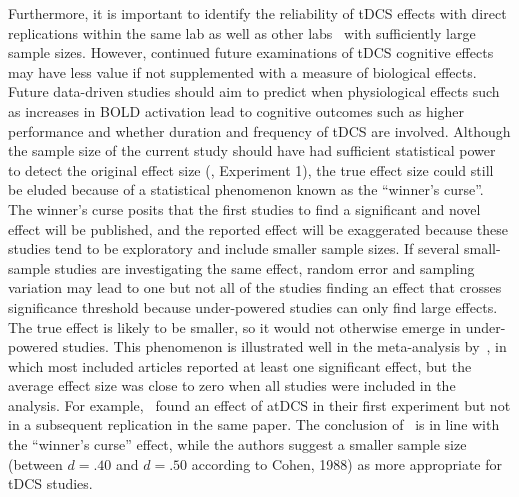 \documentclass[10pt,letterpaper]{article}
\begin{document}
Furthermore, it is important to identify the reliability of tDCS effects with direct replications within the same lab as well as other labs~\cite{cesario2014priming} with sufficiently large sample sizes. However, continued future examinations of tDCS cognitive effects may have less value if not supplemented with a measure of biological effects. Future data-driven studies should aim to predict when physiological effects such as increases in BOLD activation lead to cognitive outcomes such as higher performance and whether duration and frequency of tDCS are involved.   
Although the sample size of the current study should have had sufficient statistical power to detect the original effect size (\cite{medvedeva2019effects}, Experiment 1), the true effect size could still be eluded because of a statistical phenomenon known as the “winner’s curse”. The winner’s curse posits that the first studies to find a significant and novel effect will be published, and the reported effect will be exaggerated because these studies tend to be exploratory and include smaller sample sizes. If several small-sample studies are investigating the same effect, random error and sampling variation may lead to one but not all of the studies finding an effect that crosses significance threshold because under-powered studies can only find large effects. The true effect is likely to be smaller, so it would not otherwise emerge in under-powered studies. This phenomenon is illustrated well in the meta-analysis by~\cite{galli2019systematic}, in which most included articles reported at least one significant effect, but the average effect size was close to zero when all studies were included in the analysis. For example,~\cite{jones2014enhanced} found an effect of atDCS in their first experiment but not in a subsequent replication in the same paper. The conclusion of~\cite{minarik2016importance} is in line with the “winner’s curse” effect, while the authors suggest a smaller sample size (between \(d = .40\) and \(d = .50\) according to Cohen, 1988) as more appropriate for tDCS studies.  
\end{document}
